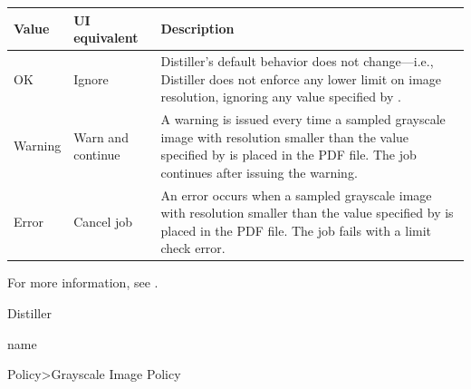 \documentclass[letterpaper,12pt,english,openany,oneside]{sphinxmanual}
\begin{document}
\begin{savenotes}\sphinxattablestart
\centering
{}\label{\detokenize{PDF_Create_CommonSettings:section-10}}\nobreak
\begin{tabulary}{\linewidth}[t]{|T|T|T|}
\hline
\sphinxstyletheadfamily 
Value
&\sphinxstyletheadfamily 
UI equivalent
&\sphinxstyletheadfamily 
Description
\\
\hline
OK
&
Ignore
&
Distiller’s default behavior does not change—i.e., Distiller does not enforce any lower limit on image resolution, ignoring any value specified by  .
\\
\hline
Warning
&
Warn and continue
&
A warning is issued every time a sampled grayscale image with resolution smaller than the value specified by  is placed in the PDF file. The job continues after issuing the warning.
\\
\hline
Error
&
Cancel job
&
An error occurs when a sampled grayscale image with resolution smaller than the value specified by  is placed in the PDF file. The job fails with a limit check error.
\\
\hline
\end{tabulary}
\par
\sphinxattableend\end{savenotes}

For more information, see .

\label{\detokenize{PDF_Create_CommonSettings:supported-by-50}}

Distiller

\label{\detokenize{PDF_Create_CommonSettings:type-50}}

name

\label{\detokenize{PDF_Create_CommonSettings:ui-name-37}}

Policy\sphinxhyphen{}>Grayscale Image Policy

\label{\detokenize{PDF_Create_CommonSettings:default-value-46}}

\begin{sphinxVerbatim}[commandchars=\\\{\}]
\end{sphinxVerbatim}
\end{document}
